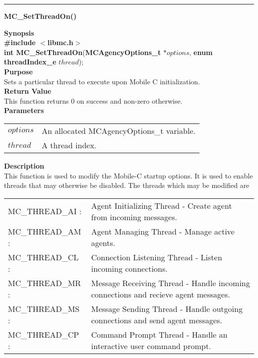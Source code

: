 \noindent
\vspace{5pt}
\rule{6.5in}{0.015in}
\noindent
{\LARGE \bf MC\_SetThreadOn()}\\
{}

\noindent
{\bf Synopsis}\\
{\bf \#include $<$libmc.h$>$}\\
{\bf int MC\_SetThreadOn}({\bf MCAgencyOptions\_t} $*options$, {\bf enum threadIndex\_e} $thread$);\\

\noindent
{\bf Purpose}\\
Sets a particular thread to execute upon Mobile C initialization.\\

\noindent
{\bf Return Value}\\
This function returns 0 on success and non-zero otherwise.\\

\noindent
{\bf Parameters}
\vspace{-0.1in}
\begin{description}
\item               
\begin{tabular}{p{10 mm}p{145 mm}}
$options$ & An allocated MCAgencyOptions\_t variable.\\
$thread$ & A thread index.
\end{tabular}
\end{description}

\noindent
{\bf Description}\\
This function is used to modify the Mobile-C startup options. 
It is used to enable threads that may otherwise be disabled. 
The threads which may be modified are
\vspace{-0.1in}
\begin{description}
\item
\begin{tabular}{p{40 mm}p{125 mm}}
MC\_THREAD\_AI : & Agent Initializing Thread - Create agent from incoming messages.\\
MC\_THREAD\_AM : & Agent Managing Thread - Manage active agents.\\
MC\_THREAD\_CL : & Connection Listening Thread - Listen incoming connections.\\
MC\_THREAD\_MR : & Message Receiving Thread - Handle incoming connections and recieve agent messages.\\
MC\_THREAD\_MS : & Message Sending Thread - Handle outgoing connections and send agent messages.\\
MC\_THREAD\_CP : & Command Prompt Thread - Handle an interactive user command prompt.
\end{tabular}
\end{description}

